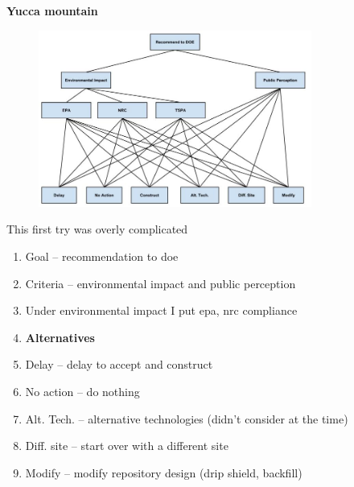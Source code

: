 \documentclass[aspectratio=1610,pdftex,dvipsnames,compress,xcolor={dvipsnames}]{beamer}
\newcommand{\acs}{\acrshort} %
\newcommand{\acsp}{\acrshortpl} %
\begin{document}
\begin{frame}[plain]{}
    \centering\LARGE\textbf{Yucca mountain}
\end{frame}


\addtocounter{framenumber}{-1}
\begin{frame}{}
    \begin{figure}
        \centering
        \includegraphics[width=0.80\textwidth]{ahp_first.try.jpg}
    \end{figure}
\end{frame}


\begin{frame}{This first try was overly complicated}
    \begin{enumerate}[series=outerlist,topsep=0pt,itemsep=1pt,leftmargin=*,label=(\arabic*)]
        \item[]Goal -- recommendation to \acs{doe}
        \item[]Criteria -- environmental impact and public perception
        \item[]Under environmental impact I put \acs{epa}, \acs{nrc} compliance
            \vspace{0.15in}
        \item[]\textbf{Alternatives}
        \item[]Delay -- delay to accept and construct
        \item[]No action -- do nothing
        \item[]Alt. Tech. -- alternative technologies (didn't consider \acsp{cis} at the time)
        \item[]Diff. site -- start over with a different site  
        \item[]Modify -- modify repository design (drip shield, backfill)
    \end{enumerate}
\end{frame}
\end{document}
